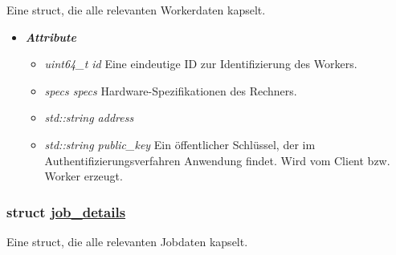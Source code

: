 \documentclass[a4paper,12pt]{article}
\newcommand\purl[1]{\protect\url{#1}}
\begin{document}
Eine struct, die alle relevanten Workerdaten kapselt.


\begin{itemize}[label={}]

	\item \textit{\textbf{Attribute}}
		\begin{itemize}[label={\textbullet}]
			\item \textit{uint64\_t id} Eine eindeutige ID zur Identifizierung des Workers.
			
			\item \textit{specs specs} Hardware-Spezifikationen des Rechners.
			
			\item \textit{std::string address}
			
			\item \textit{std::string public\_key} Ein öffentlicher Schlüssel, der im Authentifizierungsverfahren Anwendung findet. Wird vom Client bzw. Worker erzeugt.
		\end{itemize}


\end{itemize}
\clearpage

\subsubsection{struct \purl{job_details}}

Eine struct, die alle relevanten Jobdaten kapselt.
\end{document}
